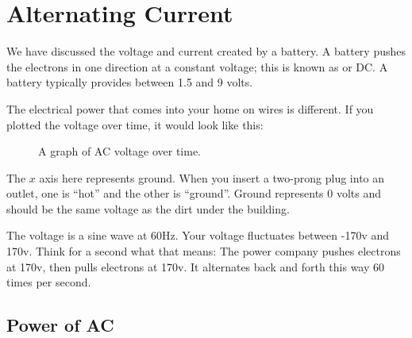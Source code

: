 \chapter{Alternating Current}
We have discussed the voltage and current created by a battery.  A
battery pushes the electrons in one direction at a constant voltage;
this is known as  or DC. A battery typically
provides between 1.5 and 9 volts.

The electrical power that comes into your home on wires is
different. If you plotted the voltage over time, it would look like
this:
\begin{figure}[htbp]
    \centering
    \caption{A graph of AC voltage over time.}
    \label{fig:acvoltsGraph}
\end{figure}

The $x$ axis here represents ground. When you insert a two-prong plug
into an outlet, one is ``hot'' and the other is ``ground''. Ground
represents 0 volts and should be the same voltage as the dirt under
the building.

The voltage is a sine wave at 60Hz. Your voltage fluctuates between
-170v and 170v. Think for a second what that means: The power company
pushes electrons at 170v, then pulls electrons at 170v.  It
alternates back and forth this way 60 times per second.

\section{Power of AC}


